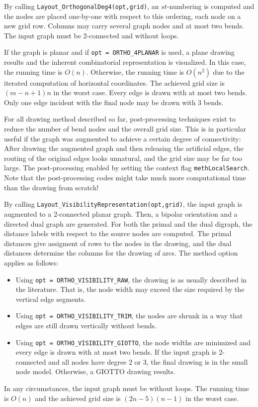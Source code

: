 \documentclass[a4paper,11pt,twoside]{book}
\begin{document}
\begin{multicols}{2}
By calling \verb/Layout_OrthogonalDeg4(opt,grid)/, an $st$-numbering is
computed and the nodes are placed one-by-one with respect to this ordering,
each node on a new grid row. Columns may carry several graph nodes and at most
two bends. The input graph must be 2-connected and without loops.

If the graph is planar and if \verb/opt = ORTHO_4PLANAR/ is used, a plane drawing
results and the inherent combinatorial representation is visualized. In this case,
the running time is $O(n)$. Otherwise, the running time is $O(n^2)$ due to the iterated
computation of horizontal coordinates. The achieved grid size is $(m-n+1)n$ in
the worst case. Every edge is drawn with at most two bends. Only one edge
incident with the final node may be drawn with 3 bends.

For all drawing method described so far, post-processing techniques exist to
reduce the number of bend nodes and the overall grid size. This is in particular
useful if the graph was augmented to achieve a certain degree of connectivity:
After drawing the augmented graph and then releasing the artificial edges, the
routing of the original edges looks unnatural, and the grid size may be far too
large. The post-processing enabled by setting the context flag
\verb/methLocalSearch/. Note that the post-processing codes might take much more
computational time than the drawing from scratch!

By calling \verb/Layout_VisibilityRepresentation(opt,grid)/, the input graph is
augmented to a 2-connected planar graph. Then, a bipolar orientation and a
directed dual graph are generated. For both the primal and the dual digraph,
the distance labels with respect to the source nodes are computed. The primal
distances give assigment of rows to the nodes in the drawing, and the dual
distances determine the columns for the drawing of arcs. The method option
applies as follows:
\begin{itemize}
\item Using \verb/opt = ORTHO_VISIBILITY_RAW/, the drawing is as usually
    described in the literature. That is, the node width may exceed the size
    required by the vertical edge segments.
\item Using \verb/opt = ORTHO_VISIBILITY_TRIM/, the nodes are shrunk in a way
    that edges are still drawn vertically without bends.
\item Using \verb/opt = ORTHO_VISIBILITY_GIOTTO/, the node widths are minimized
    and every edge is drawn with at most two bends. If the input graph is
    2-connected and all nodes have degree 2 or 3, the final drawing is in the
    small node model. Otherwise, a GIOTTO drawing results.
\end{itemize}
In any circumstances, the input graph must be without loops. The running time
is $O(n)$ and the achieved grid size is $(2n-5)(n-1)$ in the worst case.


\end{multicols}
\end{document}
